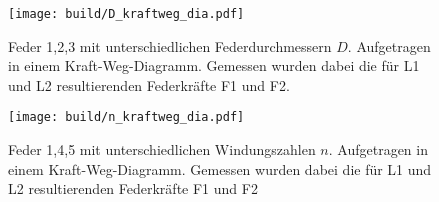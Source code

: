 \begin{figure}
    \texttt{[image: build/D\_kraftweg\_dia.pdf]}
    \caption{Feder 1,2,3 mit unterschiedlichen Federdurchmessern $D$.
    Aufgetragen in einem Kraft-Weg-Diagramm. Gemessen wurden dabei
    die für L1 und L2 resultierenden Federkräfte F1 und F2.}
\end{figure}

\begin{figure}
    \texttt{[image: build/n\_kraftweg\_dia.pdf]}
    \caption{Feder 1,4,5 mit unterschiedlichen Windungszahlen $n$.
    Aufgetragen in einem Kraft-Weg-Diagramm. Gemessen wurden dabei die für L1
    und L2 resultierenden Federkräfte F1 und F2}
\end{figure}


\label{sec:Auswertung}

